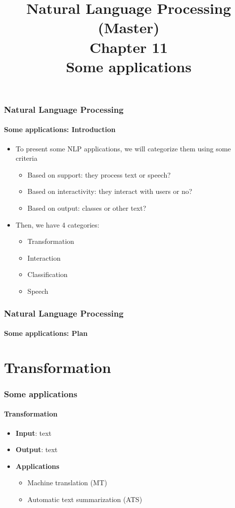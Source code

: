 \documentclass[xcolor=table]{beamer}
\title[ESI - NLP(master): 11- Some applications]%
{Natural Language Processing (Master)\\Chapter 11\\Some applications}
\begin{document}
	
\begin{frame}
\frametitle{Natural Language Processing}
\framesubtitle{Some applications: Introduction}

	\begin{itemize}
		\item To present some NLP applications, we will categorize them using some criteria
		\begin{itemize}
			\item Based on support: they process text or speech?
			\item Based on interactivity: they interact with users or no?
			\item Based on output: classes or other text?
		\end{itemize}
		\item Then, we have 4 categories:
		\begin{itemize}
			\item Transformation
			\item Interaction
			\item Classification
			\item Speech
		\end{itemize}
	\end{itemize}

\end{frame}

\begin{frame}
\frametitle{Natural Language Processing}
\framesubtitle{Some applications: Plan}

\begin{multicols}{2}
\tableofcontents
\end{multicols}
\end{frame}

\section{Transformation}

\begin{frame}
	\frametitle{Some applications}
	\framesubtitle{Transformation}
	\begin{itemize}
		\item \textbf{Input}: text 
		\item \textbf{Output}: text
		\item \textbf{Applications} 
		\begin{itemize}
			\item Machine translation (MT)
			\item Automatic text summarization (ATS)
		\end{itemize}
	\end{itemize}
\end{frame}
\end{document}
